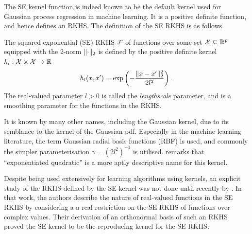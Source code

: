 The \gls*{SE} kernel function is indeed known to be the default kernel used for Gaussian process regression in machine learning.
It is a positive definite function, and hence defines an RKHS.
The definition of the \gls*{SE} RKHS is as follows.

\begin{definition}
  The squared exponential (SE) RKHS ${\mathcal F}$ of functions over some set ${\mathcal X} \subseteq \mathbb{R}^p$ equipped with the 2-norm $\lVert\cdot\rVert_2$ is defined by the positive definite kernel $h_l:{\mathcal X}\times{\mathcal X}\to\mathbb{R}$ 
  \[
    h_l(x,x') = \exp\left( -\frac{\lVert x-x'\rVert_2^2}{2l^2} \right).
  \]
  The real-valued parameter $l > 0$ is called the \emph{lengthscale} parameter, and is a smoothing parameter for the functions in the RKHS.
\end{definition}

It is known by many other names, including the Gaussian kernel, due to its semblance to the kernel of the Gaussian pdf. 
Especially in the machine learning literature, the term Gaussian radial basis functions (RBF) is used, and commonly the simpler parameterisation $\gamma = (2l^2)^{-1}$ is utilised.
\citet{duvenaud2014automatic} remarks that ``exponentiated quadratic'' is a more aptly descriptive name for this kernel.

Despite being used extensively for learning algorithms using kernels, an explicit study of the RKHS defined by the SE kernel was not done until recently by \citet{steinwart2006explicit}.
In that work, the authors describe the nature of real-valued functions in the SE RKHS by considering a a real restriction on the SE RKHS of functions over complex values.
Their derivation of an orthonormal basis of such an RKHS proved the SE kernel to be the reproducing kernel for the SE RKHS.

